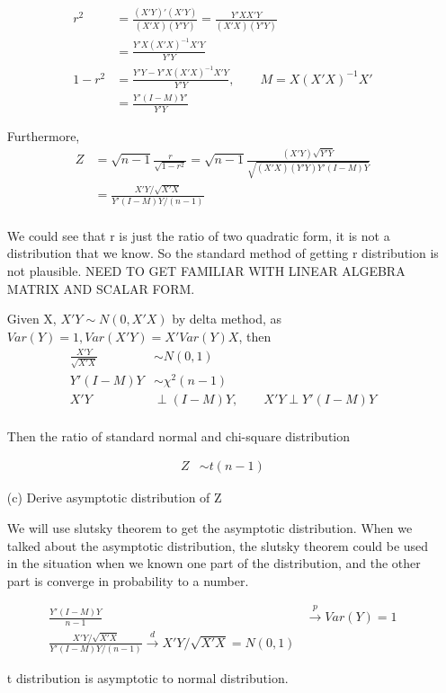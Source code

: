 \begin{itemize}
\begin{align*}
r^2 &= \frac{ (X'Y)' (X'Y)}{(X'X)(Y'Y)} = \frac{Y' X X' Y }{(X'X)(Y'Y)}\\
&= \frac{Y' X(X'X)^{-1}X' Y}{Y'Y} \\
1- r^2 &=  \frac{Y'Y - Y' X(X'X)^{-1} X' Y}{Y'Y}, \qquad M= X(X'X)^{-1}X'\\
&= \frac{Y' (I-M) Y'}{Y'Y}
\end{align*}

Furthermore,
\begin{align*}
Z &=\sqrt{n-1} \frac{r}{\sqrt{1- r^2}} = \sqrt{n-1} \frac{ (X'Y) \sqrt{Y'Y} }{ \sqrt{ (X'X)(Y'Y) Y'(I-M)Y} }  \\
& = \frac{X' Y \Big / \sqrt{X'X}}{ Y'(I-M)Y \Big / (n-1) }\\
\end{align*}

We could see that r is just the ratio of two quadratic form, it is not a distribution that we know. So the standard method of getting r distribution is not plausible. 
NEED TO GET FAMILIAR WITH LINEAR ALGEBRA MATRIX AND SCALAR FORM.

Given X, $X'Y \sim N(0, X'X)$ by delta method, as $Var(Y) = 1, Var(X'Y) = X' Var(Y) X$, then
\begin{align*}
\frac{X'Y}{\sqrt{X'X}} & \sim N(0,1) \\
Y'(I-M)Y & \sim \chi^2(n-1)\\
X'Y & \perp (I-M)Y, \qquad X'Y \perp Y'(I-M) Y \\
\end{align*}

Then the ratio of standard normal and chi-square distribution

\begin{align*}
Z & \sim t(n-1)
\end{align*}

\item[(c)] Derive asymptotic distribution of Z

We will use slutsky theorem to get the asymptotic distribution. When we talked about the asymptotic distribution, the slutsky theorem could be used in the situation when we known one part of the distribution, and the other part is converge in probability to a number. 

\begin{align*}
\frac{Y'(I-M)Y}{n-1} & \xrightarrow{p} Var(Y) = 1 \\
\frac{X' Y \Big / \sqrt{X'X}}{ Y'(I-M)Y \Big / (n-1) } \xrightarrow{d} X' Y \Big / \sqrt{X'X} = N(0,1)
\end{align*}

t distribution is asymptotic to normal distribution.

\end{itemize}
